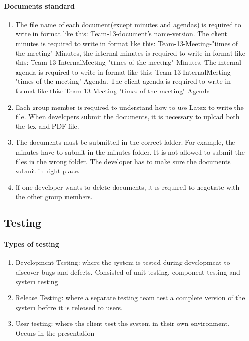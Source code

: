 \documentclass[11pt, a4paper]{report}
\begin{document}
\paragraph{Documents standard}

\begin{enumerate}
	\item The file name of each document(except minutes and agendas) is required to write in format like this: Team-13-document's name-version. The client minutes is required to write in format like this:
	Team-13-Meeting-"times of the meeting"-Minutes, the internal minutes is required to write in format like this: Team-13-InternalMeeting-"times of the meeting"-Minutes. The internal agenda is required to write in format like this: Team-13-InternalMeeting-"times of the meeting"-Agenda. The client agenda is required to write in format like this: Team-13-Meeting-"times of the meeting"-Agenda. 
	\item Each group member is required to understand how to use Latex to write the file. When developers submit the documents, it is necessary to upload both the tex and PDF file.
	\item The documents must be submitted in the correct folder. For example, the minutes have to submit in the minutes folder. It is not allowed to submit the files in the wrong folder. The developer has to make sure the documents submit in right place. 
	\item If one developer wants to delete documents, it is required to negotiate with the other group members. 
\end{enumerate}

\subsection{Testing}

\paragraph{Types of testing}
\begin{enumerate}
  	\item Development Testing: where the system is tested during development to discover bugs
and defects. Consisted of unit testing, component testing and system testing
	\item Release Testing: where a separate testing team test a complete version of the system before it is released to users.
	\item User testing: where the client test the system in their own environment. Occurs in the presentation
\end{enumerate}
\end{document}

